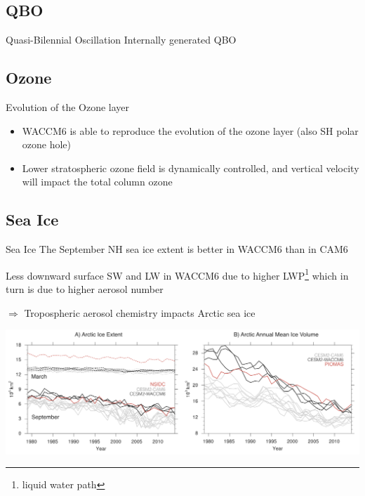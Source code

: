 \documentclass[xcolor=dvipsnames]{beamer} %
\begin{document}
\subsection{QBO}
\begin{frame}{Quasi-Bilennial Oscillation}
	Internally generated QBO
\end{frame}

\subsection{Ozone}
\begin{frame}{Evolution of the Ozone layer}
	\begin{itemize}
		\item WACCM6 is able to reproduce the evolution of the ozone layer (also SH polar ozone hole)
		\item Lower stratospheric ozone field is dynamically controlled, and vertical
		      velocity will impact the total column ozone
	\end{itemize}
\end{frame}

\subsection{Sea Ice}
\begin{frame}{Sea Ice}
	The September NH sea ice extent is better in WACCM6 than in CAM6

	Less downward surface SW and LW in WACCM6 due to higher LWP\footnote{liquid
		water path} which in turn is due to higher aerosol number

	$ \Rightarrow $ Tropospheric aerosol chemistry impacts Arctic sea ice

	\begin{center}
		\includegraphics[width=0.95\linewidth]{./assets/ice-extent3.png}
	\end{center}

\end{frame}
\end{document}
